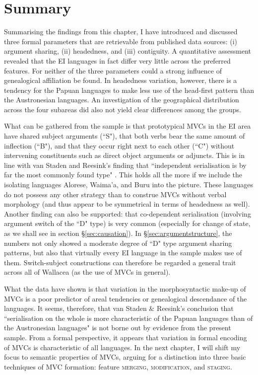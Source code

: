 \section{Summary}

Summarising the findings from this chapter, I have introduced and discussed three formal parameters that are retrievable from published data sources: (i) argument sharing, (ii) headedness, and (iii) contiguity. A quantitative assessment revealed that the EI languages in fact differ very little across the preferred features. For neither of the three parameters could a strong influence of genealogical affiliation be found. In headedness variation, however, there is a tendency for the Papuan languages to make less use of the head-first pattern than the Austronesian languages. An investigation of the geographical distribution across the four subareas did also not yield clear differences among the groups.

What can be gathered from the sample is that prototypical MVCs in the EI area have shared subject arguments (``S"), that both verbs bear the same amount of inflection (``B"), and that they occur right next to each other (``C") without intervening constituents such as direct object arguments or adjuncts. This is in line with van Staden and Reesink's finding that ``independent serialisation is by far the most commonly found type" \citep[48]{vanstaden2008serial}. This holds all the more if we include the isolating languages Alorese, Waima'a, and Buru into the picture. These languages do not possess any other strategy than to construe MVCs without verbal morphology (and thus appear to be symmetrical in terms of headedness as well). Another finding can also be supported: that co-dependent serialisation (involving argument switch of the ``D" type) is very common (especially for change of state, as we shall see in section §\ref{sec:causation}). In §\ref{sec:argumentstructure}, the numbers not only showed a moderate degree of ``D" type argument sharing patterns, but also that virtually every EI language in the sample makes use of them. Switch-subject constructions can therefore be regarded a general trait across all of Wallacea (as the use of MVCs in general).

What the data have shown is that variation in the morphosyntactic make-up of MVCs is a poor predictor of areal tendencies or genealogical descendance of the languages. It seems, therefore, that van Staden \& Reesink's conclusion that ``serialisation on the whole is more characteristic of the Papuan languages than of the Austronesian languages" \citep[50]{vanstaden2008serial} is not borne out by evidence from the present sample. From a formal perspective, it appears that variation in formal encoding of MVCs is characteristic of all languages. In the next chapter, I will shift my focus to semantic properties of MVCs, arguing for a distinction into three basic techniques of MVC formation: feature \textsc{merging}, \textsc{modification}, and \textsc{staging}.
